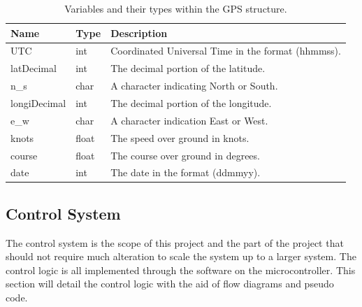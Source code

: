 	\begin{table}[!ht]
		\begin{center}
			\caption{Variables and their types within the GPS structure.}
			\label{tab:3:GPSstruct}
			\begin{tabular}{|l|l|l|}
				\hline
				\textbf{Name} & \textbf{Type} & \textbf{Description} \\
				\hline
				UTC & int & Coordinated Universal Time in the format (hhmmss). \\
				\hline
				latDecimal & int & The decimal portion of the latitude. \\
				\hline
				n\_s & char & A character indicating North or South. \\
				\hline 
				longiDecimal & int & The decimal portion of the longitude. \\
				\hline 
				e\_w & char & A character indication East or West. \\
				\hline
				knots & float & The speed over ground in knots. \\
				\hline
				course & float & The course over ground in degrees. \\
				\hline
				date & int & The date in the format (ddmmyy). \\
				\hline
			\end{tabular}
		\end{center}
	\end{table}
	\subsection{Control System}
	The control system is the scope of this project and the part of the project that should not require much alteration to scale the system up to a larger system. The control logic  is all implemented through the software on the microcontroller. This section will detail the control logic with the aid of flow diagrams and pseudo code. 
